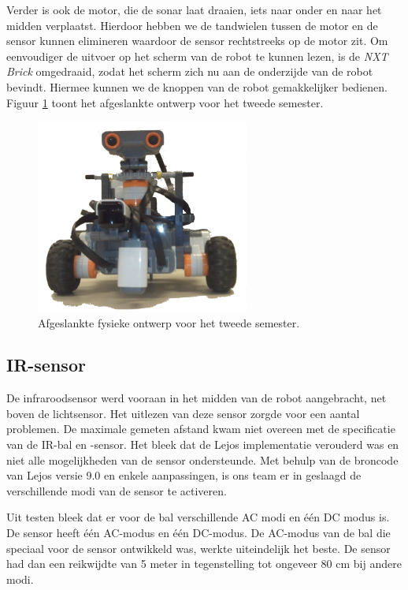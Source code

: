 \documentclass[12pt,a4paper]{report}
\begin{document}
Verder is ook de motor, die de sonar laat draaien, iets naar onder en naar het midden verplaatst. Hierdoor hebben we de tandwielen tussen de motor en de sensor kunnen elimineren waardoor de sensor rechtstreeks op de motor zit. Om eenvoudiger de uitvoer op het scherm van de robot te kunnen lezen, is de \emph{NXT Brick} omgedraaid, zodat het scherm zich nu aan de onderzijde van de robot bevindt. Hiermee kunnen we de knoppen van de robot gemakkelijker bedienen. Figuur \ref{fig:fysiek2} toont het afgeslankte ontwerp voor het tweede semester.

\begin{figure}[htbp]
  \centering
  \includegraphics[width=70mm]{resources/RobotPlatinum.png}
  \caption{Afgeslankte fysieke ontwerp voor het tweede semester.}
  \label{fig:fysiek2}
\end{figure}

\subsection{IR-sensor}

De infraroodsensor werd vooraan in het midden van de robot aangebracht, net boven de lichtsensor. Het uitlezen van deze sensor zorgde voor een aantal problemen. De maximale gemeten afstand kwam niet overeen met de specificatie van de IR-bal en -sensor. Het bleek dat de Lejos implementatie verouderd was en niet alle mogelijkheden van de sensor ondersteunde. Met behulp van de broncode van Lejos versie 9.0 en enkele aanpassingen, is ons team er in geslaagd de verschillende modi van de sensor te activeren.

Uit testen bleek dat er voor de bal verschillende AC modi en \'e\'en DC modus is. De sensor heeft \'e\'en AC-modus en \'e\'en DC-modus. De AC-modus van de bal die speciaal voor de sensor ontwikkeld was, werkte uiteindelijk het beste. De sensor had dan een reikwijdte van 5 meter in tegenstelling tot ongeveer 80 cm bij andere modi.
\end{document}
